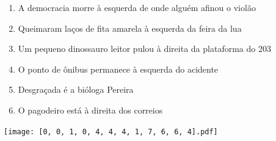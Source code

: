 \documentclass[12pt]{article}
\begin{document}
		 

\pagebreak


	\begin{enumerate}
		  \sffamily %
		  \large %


\vfill \item
A democracia morre	%
à esquerda
de onde alguém afinou o violão	%

\vfill \item
Queimaram laços de fita amarela	%
à esquerda
da feira da lua	%

\vfill \item
Um pequeno dinossauro leitor pulou	%
à direita
da plataforma do 203	%

\vfill \item
O ponto de ônibus permanece	%
à esquerda
do acidente	%

\vfill \item
Desgraçada é	%
a bióloga Pereira	%

\vfill \item
O pagodeiro está	%
à direita
dos correios	%
	\end{enumerate}
		  
		  \hfill

		  \vfill

\texttt{[image: [0, 0, 1, 0, 4, 4, 4, 1, 7, 6, 6, 4].pdf]}


	\hfill	  	  


\pagebreak			
\end{document}
